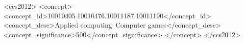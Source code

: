 \message{ !name(fdg_template.tex)}\documentclass[sigconf]{acmart}
\begin{document}
%
%
\begin{CCSXML}
<ccs2012>
<concept>
<concept_id>10010405.10010476.10011187.10011190</concept_id>
<concept_desc>Applied computing~Computer games</concept_desc>
<concept_significance>500</concept_significance>
</concept>
</ccs2012>
\end{CCSXML}




\maketitle




 
\end{document}
